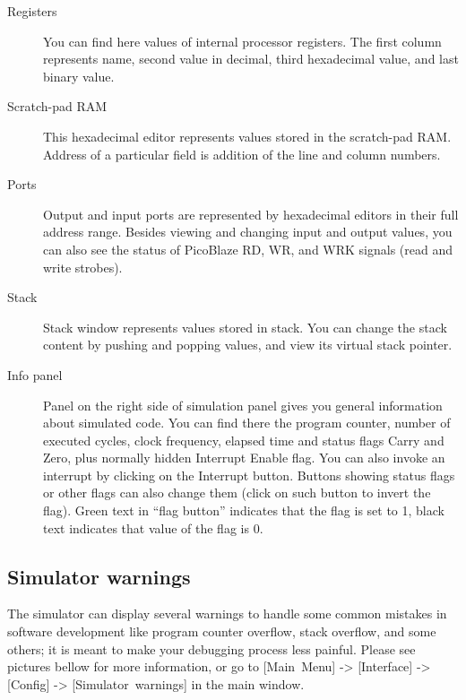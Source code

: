     \begin{description}
        \item [Registers]
            You can find here values of internal processor registers. The first column represents name, second value in decimal, third hexadecimal value, and last binary value.
        \item [Scratch-pad RAM]
            This hexadecimal editor represents values stored in the scratch-pad RAM. Address of a particular field is addition of the line and column numbers.
        \item [Ports]
            Output and input ports are represented by hexadecimal editors in their full address range. Besides viewing and changing input and output values, you can also see the status of PicoBlaze RD, WR, and WRK signals (read and write strobes).
        \item [Stack]
            Stack window represents values stored in stack. You can change the stack content by pushing and popping values, and view its virtual stack pointer.
        \item [Info panel]
            Panel on the right side of simulation panel gives you general information about simulated code. You can find there the program counter, number of executed cycles, clock frequency, elapsed time and status flags Carry and Zero, plus normally hidden Interrupt Enable flag. You can also invoke an interrupt by clicking on the Interrupt button. Buttons showing status flags or other flags can also change them (click on such button to invert the flag). Green text in ``flag button'' indicates that the flag is set to 1, black text indicates that value of the flag is 0.
    \end{description}

    \subsection{Simulator warnings}
        The simulator can display several warnings to handle some common mistakes in software development like program counter overflow, stack overflow, and some others; it is meant to make your debugging process less painful. Please see pictures bellow for more information, or go to [Main~Menu] -> [Interface] -> [Config] -> [Simulator~warnings] in the main window.

